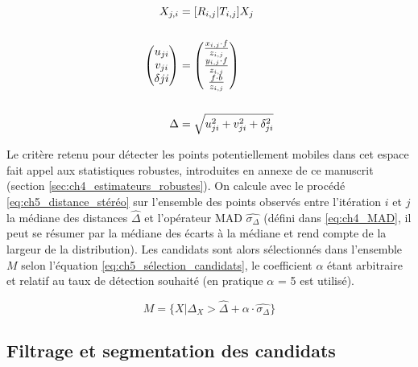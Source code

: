 \begin{align} \label{eq:ch5_distance_stéréo}
	X_{j,i} &= [R_{i,j} | T_{i,j}] X_j \\ 
	\notag \\
 	\begin{pmatrix}u_{ji}\\v_{ji}\\\delta{ji}\end{pmatrix} &= \begin{pmatrix}\frac{x_{i,j} \cdot f}{z_{i,j}} \\ \frac{y_{i,j} \cdot f}{z_{i,j}} \\ \frac{f \cdot b} {z_{i,j}} \end{pmatrix} \\
 	\notag \\
 	\Delta &= \sqrt{ u_{ji}^2 + v_{ji}^2 + \delta_{ji}^2}
\end{align}

Le critère retenu pour détecter les points potentiellement mobiles dans cet espace fait appel aux statistiques robustes, introduites en annexe de ce manuscrit (section \ref{sec:ch4_estimateurs_robustes}). On calcule avec le procédé \ref{eq:ch5_distance_stéréo} sur l'ensemble des points observés entre l'itération $i$ et $j$ la médiane des distances $\hat{\Delta}$ et l'opérateur MAD $\hat{\sigma_{\Delta}}$ (défini dans \ref{eq:ch4_MAD}, il peut se résumer par la médiane des écarts à la médiane et rend compte de la largeur de la distribution). Les candidats sont alors sélectionnés dans l'ensemble $M$ selon l'équation \ref{eq:ch5_sélection_candidats}, le coefficient $\alpha$ étant arbitraire et relatif au taux de détection souhaité (en pratique $\alpha$ = 5 est utilisé).

\begin{equation} \label{eq:ch5_sélection_candidats}
	M = \lbrace X | \Delta_X > \hat{\Delta} + \alpha \cdot \hat{\sigma_{\Delta}} \rbrace
\end{equation}

\subsection{Filtrage et segmentation des candidats} 
